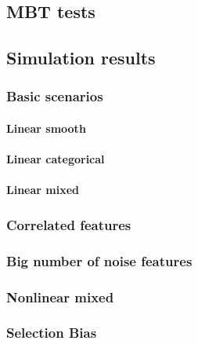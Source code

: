 \subsection{MBT tests}


\subsection{Simulation results}
\subsubsection{Basic scenarios}
\paragraph{Linear smooth}

\paragraph{Linear categorical}

\paragraph{Linear mixed}

\subsubsection{Correlated features}

\subsubsection{Big number of noise features}

\subsubsection{Nonlinear mixed}


\subsubsection{Selection Bias}